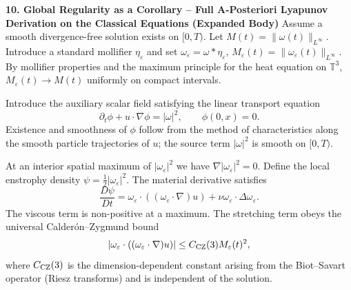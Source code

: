 \documentclass[11pt,a4paper]{article}
\begin{document}
\textbf{10. Global Regularity as a Corollary -- Full A-Posteriori Lyapunov Derivation on the Classical Equations (Expanded Body)}  
Assume a smooth divergence-free solution exists on \([0,T)\). Let \(M(t)=\|\omega(t)\|_{L^\infty}\). Introduce a standard mollifier \(\eta_\varepsilon\) and set \(\omega_\varepsilon=\omega*\eta_\varepsilon\), \(M_\varepsilon(t)=\|\omega_\varepsilon(t)\|_{L^\infty}\). By mollifier properties and the maximum principle for the heat equation on \(\mathbb{T}^3\), \(M_\varepsilon(t)\to M(t)\) uniformly on compact intervals.  

Introduce the auxiliary scalar field satisfying the linear transport equation  
\[
\partial_t\phi+u\cdot\nabla\phi=|\omega|^2,\qquad\phi(0,x)=0.
\]  
Existence and smoothness of \(\phi\) follow from the method of characteristics along the smooth particle trajectories of \(u\); the source term \(|\omega|^2\) is smooth on \([0,T)\).  

At an interior spatial maximum of \(|\omega_\varepsilon|^2\) we have \(\nabla|\omega_\varepsilon|^2=0\). Define the local enstrophy density \(\psi=\frac12|\omega_\varepsilon|^2\). The material derivative satisfies  
\[
\frac{D\psi}{Dt}=\omega_\varepsilon\cdot((\omega_\varepsilon\cdot\nabla)u)+\nu\omega_\varepsilon\cdot\Delta\omega_\varepsilon.
\]  
The viscous term is non-positive at a maximum. The stretching term obeys the universal Calder\'on--Zygmund bound  
\[
|\omega_\varepsilon\cdot((\omega_\varepsilon\cdot\nabla)u)|\le C_{\rm CZ}(3)M_\varepsilon(t)^2,
\]  
where \(C_{\rm CZ}(3)\) is the dimension-dependent constant arising from the Biot--Savart operator (Riesz transforms) and is independent of the solution.  
\end{document}
